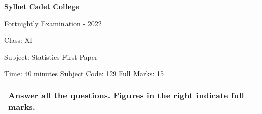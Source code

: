 \documentclass{article}
\begin{document}
\begin{center}
  \bfseries\large
  Sylhet Cadet College

\normalsize
Fortnightly Examination - 2022

  Class: XI

  Subject: Statistics First Paper

  Time: 40 minutes \qquad \qquad  \qquad \qquad Subject Code: 129  \qquad  \qquad \qquad  \qquad Full Marks: 15

\end{center}

\noindent
\begin{tabular}{p{\dimexpr\linewidth-2\tabcolsep}}
  Answer all the questions. Figures in the right indicate full marks.\\
  \hline
\end{tabular}
\end{document}
